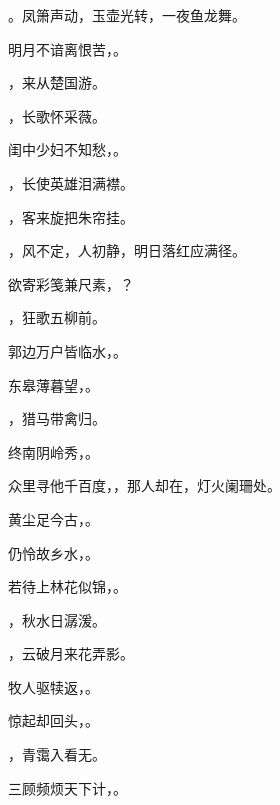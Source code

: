 \documentclass[12pt, a4paper, addpoints]{exam}
\begin{document}
\begin{multicols}{2}
\begin{questions}
\question[2] \uline{\qquad\qquad\qquad\qquad}。凤箫声动，玉壶光转，一夜鱼龙舞。

\question[2] 明月不谙离恨苦，\uline{\qquad\qquad\qquad\qquad}。

\question[2] \uline{\qquad\qquad\qquad\qquad}，来从楚国游。

\question[1] 

\question[2] \uline{\qquad\qquad\qquad\qquad}，长歌怀采薇。

\question[2] 闺中少妇不知愁，\uline{\qquad\qquad\qquad\qquad}。

\question[2] \uline{\qquad\qquad\qquad\qquad}，长使英雄泪满襟。

\question[2] \uline{\qquad\qquad\qquad\qquad}，客来旋把朱帘挂。

\question[2] \uline{\qquad\qquad\qquad\qquad}，风不定，人初静，明日落红应满径。

\question[2] 欲寄彩笺兼尺素，\uline{\qquad\qquad\qquad\qquad}？

\question[2] \uline{\qquad\qquad\qquad\qquad}，狂歌五柳前。

\question[2] 郭边万户皆临水，\uline{\qquad\qquad\qquad\qquad}。

\question[2] 东皋薄暮望，\uline{\qquad\qquad\qquad\qquad}。

\question[2] \uline{\qquad\qquad\qquad\qquad}，猎马带禽归。

\question[2] 终南阴岭秀，\uline{\qquad\qquad\qquad\qquad}。

\question[2] 众里寻他千百度，\uline{\qquad\qquad\qquad\qquad}，那人却在，灯火阑珊处。

\question[2] 黄尘足今古，\uline{\qquad\qquad\qquad\qquad}。

\question[2] 仍怜故乡水，\uline{\qquad\qquad\qquad\qquad}。

\question[2] 若待上林花似锦，\uline{\qquad\qquad\qquad\qquad}。

\question[2] \uline{\qquad\qquad\qquad\qquad}，秋水日潺湲。

\question[2] \uline{\qquad\qquad\qquad\qquad}，云破月来花弄影。

\question[2] 牧人驱犊返，\uline{\qquad\qquad\qquad\qquad}。

\question[2] 惊起却回头，\uline{\qquad\qquad\qquad\qquad}。

\question[2] \uline{\qquad\qquad\qquad\qquad}，青霭入看无。

\question[2] 三顾频烦天下计，\uline{\qquad\qquad\qquad\qquad}。


\end{questions}
\end{multicols}
\end{document}
